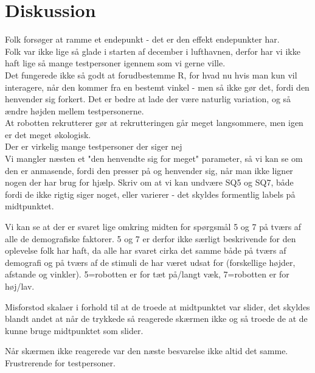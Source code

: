 \chapter{Diskussion}
\label{TestAfSkalaDiskussion}
Folk forsøger at ramme et endepunkt - det er den effekt endepunkter har.\\
Folk var ikke lige så glade i starten af december i lufthavnen, derfor har vi ikke haft lige så mange testpersoner igennem som vi gerne ville.\\
Det fungerede ikke så godt at forudbestemme R, for hvad nu hvis man kun vil interagere, når den kommer fra en bestemt vinkel - men så ikke gør det, fordi den henvender sig forkert. Det er bedre at lade der være naturlig variation, og så ændre højden mellem testpersonerne.\\
At robotten rekrutterer gør at rekrutteringen går meget langsommere, men igen er det meget økologisk.\\
Der er virkelig mange testpersoner der siger nej\\
Vi mangler næsten et "den henvendte sig for meget" parameter, så vi kan se om den er anmasende, fordi den presser på og henvender sig, når man ikke ligner nogen der har brug for hjælp.\blankline
%
Skriv om at vi kan undvære SQ5 og SQ7, både fordi de ikke rigtig siger noget, eller varierer - det skyldes formentlig labels på midtpunktet. 

Vi kan se at der er svaret lige omkring midten for spørgsmål 5 og 7 på tværs af alle de demografiske faktorer. 5 og 7 er derfor ikke særligt beskrivende for den oplevelse folk har haft, da alle har svaret cirka det samme både på tværs af demografi og på tværs af de stimuli de har været udsat for (forskellige højder, afstande og vinkler). 5=robotten er for tæt på/langt væk, 7=robotten er for høj/lav.


Misforstod skalaer i forhold til at de troede at midtpunktet var slider, det skyldes blandt andet at når de trykkede så reagerede skærmen ikke og så troede de at de kunne bruge midtpunktet som slider. 

Når skærmen ikke reagerede var den næste besvarelse ikke altid det samme. Frustrerende for testpersoner.  